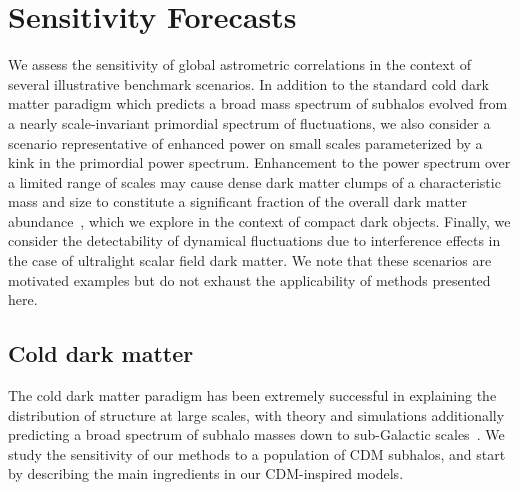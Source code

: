 \documentclass[prd,aps,twocolumn,nofootinbib,superscriptaddress,preprintnumbers,balancelastpage,longbibliography,floatfix]{revtex4-1}
\begin{document}
\section{Sensitivity Forecasts}
\label{sec:forecasts}

We assess the sensitivity of global astrometric correlations in the context of several illustrative benchmark scenarios. In addition to the standard cold dark matter paradigm which predicts a broad mass spectrum of subhalos evolved from a nearly scale-invariant primordial spectrum of fluctuations, we also consider a scenario representative of enhanced power on small scales parameterized by a kink in the primordial power spectrum. Enhancement to the power spectrum over a limited range of scales may cause dense dark matter clumps of a characteristic mass and size to constitute a significant fraction of the overall dark matter abundance~\cite{Berezinsky:2013fxa}, which we explore in the context of compact dark objects. Finally, we consider the detectability of dynamical fluctuations due to interference effects in the case of ultralight scalar field dark matter. We note that these scenarios are motivated examples but do not exhaust the applicability of methods presented here.

\subsection{Cold dark matter}
\label{sec:cdmpop}

The cold dark matter paradigm has been extremely successful in explaining the distribution of structure at large scales, with theory and simulations additionally predicting a broad spectrum of subhalo masses down to sub-Galactic scales~\cite{Madau:2008fr,Springel:2008cc}. We study the sensitivity of our methods to a population of CDM subhalos, and start by describing the main ingredients in our CDM-inspired models.
\end{document}
